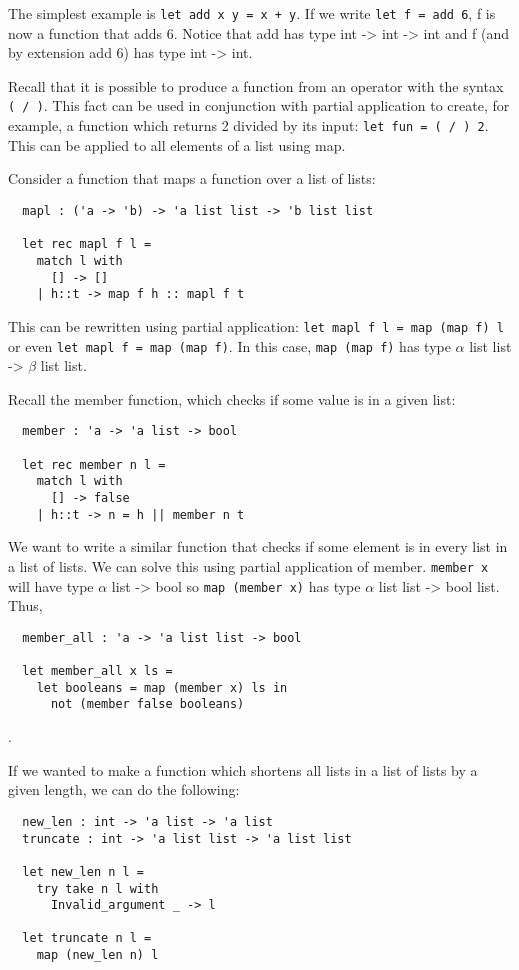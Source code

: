 \documentclass[12pt]{article}
\begin{document}
The simplest example is \texttt{let add x y = x + y}. If we write \texttt{let f = add 6}, f is now a function that
adds 6. Notice that add has type int -> int -> int and f (and by extension add 6) has type int -> int.

Recall that it is possible to produce a function from an operator with the syntax \texttt{( / )}. This fact can be
used in conjunction with partial application to create, for example, a function which returns 2 divided by its input:
\texttt{let fun = ( / ) 2}. This can be applied to all elements of a list using map.

Consider a function that maps a function over a list of lists:
\begin{lstlisting}
  mapl : ('a -> 'b) -> 'a list list -> 'b list list

  let rec mapl f l =
    match l with
      [] -> []
    | h::t -> map f h :: mapl f t
\end{lstlisting}
This can be rewritten using partial application: \texttt{let mapl f l = map (map f) l} or even \texttt{let
mapl f = map (map f)}. In this case, \texttt{map (map f)} has type $\alpha$ list list -> $\beta$ list list.

Recall the member function, which checks if some value is in a given list:
\begin{lstlisting}
  member : 'a -> 'a list -> bool

  let rec member n l =
    match l with
      [] -> false
    | h::t -> n = h || member n t
\end{lstlisting}
We want to write a similar function that checks if some element is in every list in a list of lists.
We can solve this using partial application of member. \texttt{member x} will have type $\alpha$ list -> bool
so \texttt{map (member x)} has type $\alpha$ list list -> bool list. Thus,
\begin{lstlisting}
  member_all : 'a -> 'a list list -> bool

  let member_all x ls =
    let booleans = map (member x) ls in
      not (member false booleans)
\end{lstlisting}.

If we wanted to make a function which shortens all lists in a list of lists by a given length, we can do the following:
\begin{lstlisting}
  new_len : int -> 'a list -> 'a list
  truncate : int -> 'a list list -> 'a list list

  let new_len n l =
    try take n l with
      Invalid_argument _ -> l

  let truncate n l =
    map (new_len n) l
\end{lstlisting}
\end{document}
